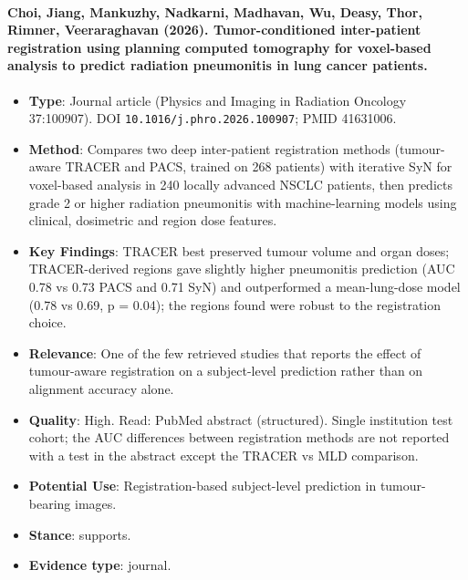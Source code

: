\documentclass[journal,onecolumn]{IEEEtran}
\begin{document}
\paragraph{Choi, Jiang, Mankuzhy, Nadkarni, Madhavan, Wu, Deasy, Thor, Rimner, Veeraraghavan (2026). Tumor-conditioned inter-patient registration using planning computed tomography for voxel-based analysis to predict radiation pneumonitis in lung cancer patients.~\cite{Choi2026Tumor}}\mbox{}

\begin{itemize}

\item{} \textbf{Type}: Journal article (Physics and Imaging in Radiation Oncology 37:100907). DOI \nolinkurl{10.1016/j.phro.2026.100907}; PMID 41631006.

\item{} \textbf{Method}: Compares two deep inter-patient registration methods (tumour-aware TRACER and PACS, trained on 268 patients) with iterative SyN for voxel-based analysis in 240 locally advanced NSCLC patients, then predicts grade 2 or higher radiation pneumonitis with machine-learning models using clinical, dosimetric and region dose features.

\item{} \textbf{Key Findings}: TRACER best preserved tumour volume and organ doses; TRACER-derived regions gave slightly higher pneumonitis prediction (AUC 0.78 vs 0.73 PACS and 0.71 SyN) and outperformed a mean-lung-dose model (0.78 vs 0.69, p = 0.04); the regions found were robust to the registration choice.

\item{} \textbf{Relevance}: One of the few retrieved studies that reports the effect of tumour-aware registration on a subject-level prediction rather than on alignment accuracy alone.

\item{} \textbf{Quality}: High. Read: PubMed abstract (structured). Single institution test cohort; the AUC differences between registration methods are not reported with a test in the abstract except the TRACER vs MLD comparison.

\item{} \textbf{Potential Use}: Registration-based subject-level prediction in tumour-bearing images.

\item{} \textbf{Stance}: supports.

\item{} \textbf{Evidence type}: journal.


\end{itemize}
\end{document}
